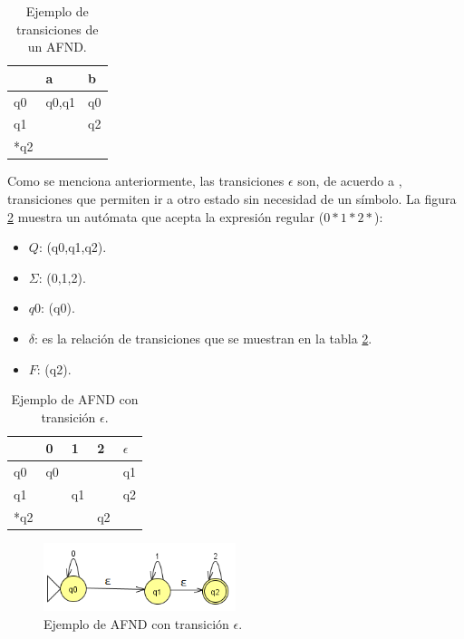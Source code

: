 \begin{table}[hbtp]
\centering
   \caption{Ejemplo de transiciones de un AFND.}
   \begin{tabular}{ | l | l | l |}
   \hline
     \rowcolor[gray]{0.5}
          &   a     &  b   \\ \hline
       q0 &  q0,q1  & q0   \\ \hline   
       q1 &         & q2   \\ \hline
      *q2 &         &      \\ \hline
   \end{tabular}
   \label{table:AFN}
\end{table}

\hspace*{1cm}Como se menciona anteriormente, las transiciones $\epsilon$ son, de acuerdo a \cite{[PINOCHO4]}, transiciones que permiten ir a otro estado sin necesidad de un símbolo. La figura \ref{table:EjemploAFND} muestra un autómata que acepta la expresión regular ($0*1*2*$):

 \begin{itemize}
\item \textbf{$Q$}: (q0,q1,q2).
\item \textbf{$\Sigma$}: (0,1,2).
\item \textbf{$q0$}: (q0).
\item \textbf{$\delta$}: es la relación de transiciones que se muestran en la tabla \ref{table:EjemploAFND}.
\item \textbf{$F$}: (q2).
\end{itemize}

 \begin{table}[hbtp]
\centering
   \caption{Ejemplo de AFND con transición $\epsilon$.}
   \begin{tabular}{ | l | l | l | l | l |}
   \hline
     \rowcolor[gray]{0.5}
          &  0  &  1  &  2  & $\epsilon$   \\ \hline
       q0 & q0  &     &     & q1           \\ \hline   
       q1 &     & q1  &     & q2           \\ \hline
      *q2 &     &     & q2  &              \\ \hline
   \end{tabular}
   \label{table:EjemploAFND}
\end{table}

 \begin{figure}[hbtp]
    \centering
        \includegraphics[width=0.5\textwidth]{MarcoTeorico/Imagenes/aufnd_b.png}
        \caption{Ejemplo de AFND con transición $\epsilon$.}     
        \label{fig:aufnd.png}
\end{figure} 

